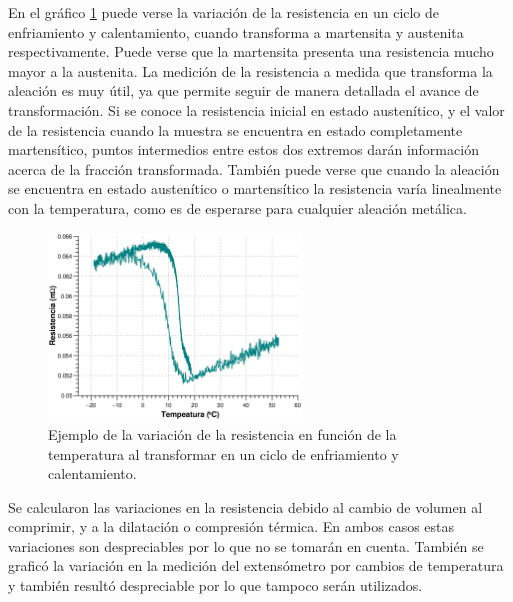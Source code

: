 \documentclass[a4paper,12pt,fleqn,twoside,openany]{book}
\begin{document}
En el gráfico \ref{fig:RvsTClavo5} puede verse la variación de la resistencia en un ciclo de enfriamiento y calentamiento, cuando transforma a martensita y austenita respectivamente. Puede verse que la martensita presenta una resistencia mucho mayor a la austenita. La medición de la resistencia a medida que transforma la aleación es muy útil, ya que permite seguir 
de manera detallada el avance de transformación. Si se conoce la resistencia inicial en estado austenítico, y el valor de la resistencia cuando la 
muestra se encuentra en estado completamente martensítico, puntos intermedios entre estos dos extremos darán información acerca de la fracción transformada.
También puede verse que cuando la aleación se encuentra en estado austenítico o martensítico la resistencia varía linealmente con la temperatura, como es 
de esperarse para cualquier aleación metálica. 

\begin{figure}[h]
 \centering
 \includegraphics[width=0.6\textwidth]{Img/Resultados/RvsTClavo5.eps}
 \caption{Ejemplo de la variación de la resistencia en función de la temperatura al transformar en un ciclo de enfriamiento y calentamiento.} 
 \label{fig:RvsTClavo5}
 \end{figure}

Se calcularon las variaciones en la resistencia debido al cambio de volumen al comprimir, y a la dilatación o compresión térmica. En ambos casos estas 
variaciones son despreciables por lo que no se tomarán en cuenta. También se graficó la variación en la medición del extensómetro por cambios de 
temperatura y también resultó despreciable por lo que tampoco serán utilizados. 









\end{document}
